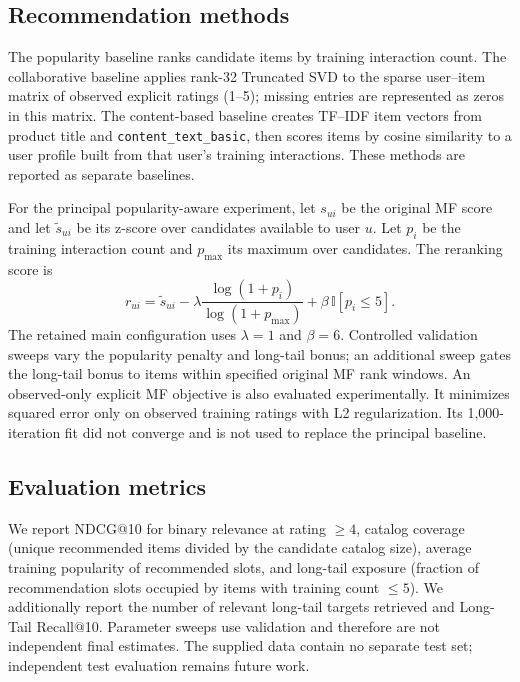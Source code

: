 \subsection{Recommendation methods}
The popularity baseline ranks candidate items by training interaction count. The collaborative baseline applies rank-32 Truncated SVD to the sparse user--item matrix of observed explicit ratings (1--5); missing entries are represented as zeros in this matrix. The content-based baseline creates TF--IDF item vectors from product title and \texttt{content\_text\_basic}, then scores items by cosine similarity to a user profile built from that user's training interactions. These methods are reported as separate baselines.

For the principal popularity-aware experiment, let $s_{ui}$ be the original MF score and let $\widetilde{s}_{ui}$ be its z-score over candidates available to user $u$. Let $p_i$ be the training interaction count and $p_{\max}$ its maximum over candidates. The reranking score is
\begin{equation}
 r_{ui}=\widetilde{s}_{ui}-\lambda\frac{\log(1+p_i)}{\log(1+p_{\max})}+\beta\,\mathbb{I}[p_i\leq 5].
\end{equation}
The retained main configuration uses $\lambda=1$ and $\beta=6$. Controlled validation sweeps vary the popularity penalty and long-tail bonus; an additional sweep gates the long-tail bonus to items within specified original MF rank windows. An observed-only explicit MF objective is also evaluated experimentally. It minimizes squared error only on observed training ratings with L2 regularization. Its 1,000-iteration fit did not converge and is not used to replace the principal baseline.

\subsection{Evaluation metrics}
We report NDCG@10 for binary relevance at rating $\geq4$, catalog coverage (unique recommended items divided by the candidate catalog size), average training popularity of recommended slots, and long-tail exposure (fraction of recommendation slots occupied by items with training count $\leq5$). We additionally report the number of relevant long-tail targets retrieved and Long-Tail Recall@10. Parameter sweeps use validation and therefore are not independent final estimates. The supplied data contain no separate test set; independent test evaluation remains future work.
